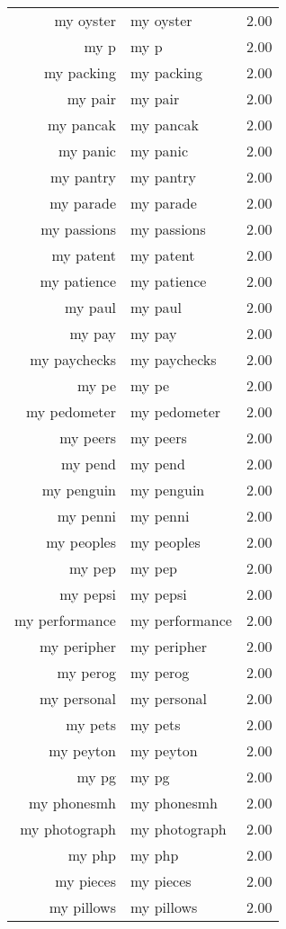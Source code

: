 \begin{table}[ht]
\begin{tabular}{rlr}
  my oyster & my oyster & 2.00 \\ 
  my p & my p & 2.00 \\ 
  my packing & my packing & 2.00 \\ 
  my pair & my pair & 2.00 \\ 
  my pancak & my pancak & 2.00 \\ 
  my panic & my panic & 2.00 \\ 
  my pantry & my pantry & 2.00 \\ 
  my parade & my parade & 2.00 \\ 
  my passions & my passions & 2.00 \\ 
  my patent & my patent & 2.00 \\ 
  my patience & my patience & 2.00 \\ 
  my paul & my paul & 2.00 \\ 
  my pay & my pay & 2.00 \\ 
  my paychecks & my paychecks & 2.00 \\ 
  my pe & my pe & 2.00 \\ 
  my pedometer & my pedometer & 2.00 \\ 
  my peers & my peers & 2.00 \\ 
  my pend & my pend & 2.00 \\ 
  my penguin & my penguin & 2.00 \\ 
  my penni & my penni & 2.00 \\ 
  my peoples & my peoples & 2.00 \\ 
  my pep & my pep & 2.00 \\ 
  my pepsi & my pepsi & 2.00 \\ 
  my performance & my performance & 2.00 \\ 
  my peripher & my peripher & 2.00 \\ 
  my perog & my perog & 2.00 \\ 
  my personal & my personal & 2.00 \\ 
  my pets & my pets & 2.00 \\ 
  my peyton & my peyton & 2.00 \\ 
  my pg & my pg & 2.00 \\ 
  my phonesmh & my phonesmh & 2.00 \\ 
  my photograph & my photograph & 2.00 \\ 
  my php & my php & 2.00 \\ 
  my pieces & my pieces & 2.00 \\ 
  my pillows & my pillows & 2.00 \\ 

\end{tabular}
\end{table}

